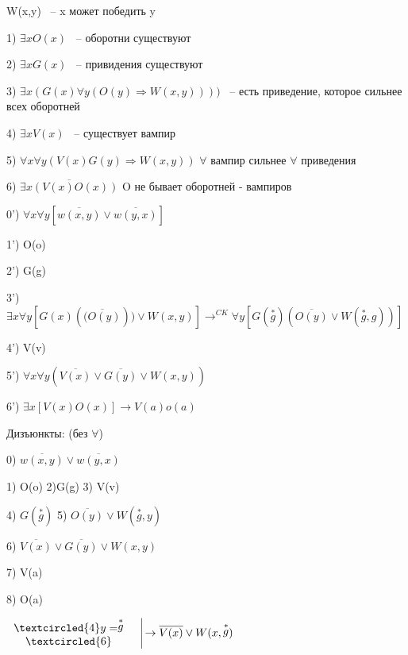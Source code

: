 \documentclass[russian]{lecture-notes}
\begin{document}
        \begin{example}

            W(x,y) ~-- x может победить y

            1) $\exists x O(x)$ ~-- оборотни существуют

            2) $\exists x G(x)$ ~-- привидения существуют

            3) $\exists x (G(x) \forall y (O(y) \Rightarrow W(x,y) )))$ ~-- есть приведение, которое сильнее всех оборотней

            4) $\exists x V(x)$ ~-- существует вампир

            5) $\forall x \forall y (V(x)G(y) \Rightarrow W(x,y) )$ \quad $\forall $ вампир сильнее $\forall $ приведения

            6) $\overline{ \exists x (V(x) O(x))} $ O не бывает оборотней - вампиров

            0') $\forall x \forall y [\overline{w(x,y)} \lor \overline{w(y,x)}]$

            1') O(o)

            2') G(g)

            3') $\exists x \forall y [G(x)(\overline{(O(y)})) \lor W(x,y)] \rightarrow^{CK} \forall y [ G(\stackrel{ * }{g}) (\overline{O(y)} \lor W(\stackrel{ * }{g},g )) ] $

            4') V(v)

            5') $\forall x \forall y (\overline{V(x)} \lor \overline{G(y)} \lor W(x,y)) $

            6') $\exists x [V(x) O(x)] \rightarrow V(a) o(a) $

            Дизъюнкты: (без $\forall$)

            0) $\overline{w(x,y) } \lor \overline{w(y,x)} $

            1) O(o) 2)G(g) 3) V(v)

            4) $G(\stackrel{ * }{g})$ 5) $\overline{O(y)} \lor W(\stackrel{ * }{g},y) $

            6) $\overline{V(x)} \lor \overline{G(y)} \lor W(x,y)$

            7) V(a)

            8) O(a)



             $
        \left.
        \begin{array}{cc}
            \textcircled{4} y = \stackrel{ * }{g} & \\
            \textcircled{6} &            \\
        \end{array}
        \right. \vline \rightarrow \overline{V(x)} \lor W(x,\stackrel{ * }{g})
        $


\end{example}
\end{document}
